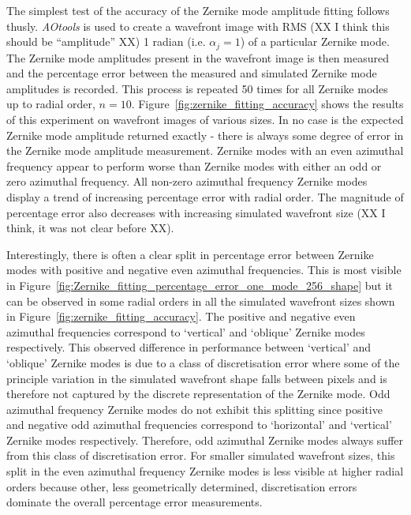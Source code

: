 The simplest test of the accuracy of the Zernike mode amplitude fitting 
follows thusly. \textit{AOtools} is used to create a wavefront image
with RMS (XX I think this should be ``amplitude'' XX) 
1 radian (i.e. $\alpha_{j} = 1$) of a particular Zernike mode. The Zernike 
mode amplitudes present in the wavefront image is then measured and the 
percentage error between the measured and simulated Zernike mode amplitudes 
is recorded. This process is repeated 50 times for all Zernike modes up to 
radial order, $n = 10$. Figure~\ref{fig:zernike_fitting_accuracy} shows the 
results of this experiment on wavefront images of various sizes. In no case 
is the expected Zernike mode amplitude returned exactly - there is always 
some degree of error in the Zernike mode amplitude measurement. Zernike modes 
with an even azimuthal frequency appear to perform worse than Zernike modes 
with either an odd or zero azimuthal frequency. All non-zero azimuthal 
frequency Zernike modes display a trend of increasing percentage error with 
radial order. The magnitude of percentage error also decreases with
increasing simulated 
wavefront size (XX I think, it was not clear before XX). 

Interestingly, there is often a clear split in percentage error between 
Zernike modes with positive and negative even azimuthal frequencies. This is most visible in 
Figure~\ref{fig:Zernike_fitting_percentage_error_one_mode_256_shape} but it 
can be observed in some radial orders in all the simulated wavefront sizes 
shown in Figure~\ref{fig:zernike_fitting_accuracy}. The positive and negative 
even azimuthal frequencies correspond to `vertical' and `oblique' Zernike 
modes respectively. This observed difference in performance between 
`vertical' and `oblique' Zernike modes is due to a class of discretisation 
error where some of the principle variation in the simulated wavefront shape 
falls between pixels and is therefore not captured by the discrete 
representation of the Zernike mode. Odd azimuthal frequency Zernike modes do 
not exhibit this splitting since positive and negative odd azimuthal 
frequencies correspond to `horizontal' and `vertical' Zernike modes 
respectively. Therefore, odd azimuthal Zernike modes always suffer from this 
class of discretisation error. For smaller simulated wavefront sizes, this 
split in the even azimuthal frequency Zernike modes is less visible at higher 
radial orders because other, less geometrically determined, discretisation 
errors dominate the overall percentage error measurements.


